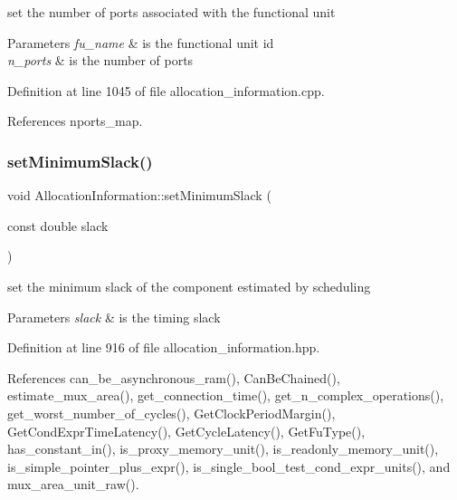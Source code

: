 set the number of ports associated with the functional unit 


\begin{DoxyParams}{Parameters}
{\em fu\+\_\+name} & is the functional unit id \\
\hline
{\em n\+\_\+ports} & is the number of ports \\
\hline
\end{DoxyParams}


Definition at line 1045 of file allocation\+\_\+information.\+cpp.



References nports\+\_\+map.

\mbox{\label{classAllocationInformation_a84649ecfe63d3cca639663ab1a01fc91}} 
\subsubsection{\texorpdfstring{set\+Minimum\+Slack()}{setMinimumSlack()}}
{\footnotesize\ttfamily void Allocation\+Information\+::set\+Minimum\+Slack (\begin{DoxyParamCaption}\item[{const double}]{slack }\end{DoxyParamCaption})\hspace{0.3cm}{\ttfamily [inline]}}



set the minimum slack of the component estimated by scheduling 


\begin{DoxyParams}{Parameters}
{\em slack} & is the timing slack \\
\hline
\end{DoxyParams}


Definition at line 916 of file allocation\+\_\+information.\+hpp.



References can\+\_\+be\+\_\+asynchronous\+\_\+ram(), Can\+Be\+Chained(), estimate\+\_\+mux\+\_\+area(), get\+\_\+connection\+\_\+time(), get\+\_\+n\+\_\+complex\+\_\+operations(), get\+\_\+worst\+\_\+number\+\_\+of\+\_\+cycles(), Get\+Clock\+Period\+Margin(), Get\+Cond\+Expr\+Time\+Latency(), Get\+Cycle\+Latency(), Get\+Fu\+Type(), has\+\_\+constant\+\_\+in(), is\+\_\+proxy\+\_\+memory\+\_\+unit(), is\+\_\+readonly\+\_\+memory\+\_\+unit(), is\+\_\+simple\+\_\+pointer\+\_\+plus\+\_\+expr(), is\+\_\+single\+\_\+bool\+\_\+test\+\_\+cond\+\_\+expr\+\_\+units(), and mux\+\_\+area\+\_\+unit\+\_\+raw().



